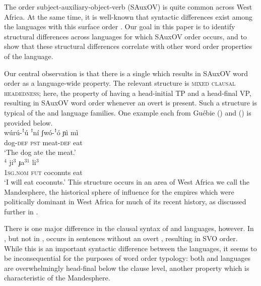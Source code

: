 \documentclass[output=paper,newtxmath,modfonts,nonflat,draftmode]{langsci/langscibook}
\begin{document}
The order subject-auxiliary-object-verb (SAuxOV) is quite common across West Africa. At the same time, it is well-known that syntactic differences exist among the languages with this surface order \citep{Creissels2005typology}. Our goal in this paper is to identify structural differences across languages for which SAuxOV order occurs, and to show that these structural differences correlate with other word order properties of the language.

Our central observation is that there is a single  which results in SAuxOV word order as a language-wide property. The relevant structure is \textsc{mixed clausal headedness}; here, the property of having a head-initial TP and a head-final VP, resulting in SAuxOV word order whenever an overt  is present. Such a structure is typical of the  and  language families. One example each from Guébie () and  () is provided below.
\ea 
\label{ex:1:sauxov}
\ea {} \\ 
\gll wúrú-ꜝú {ꜝ{ní}} {ʃwó-ꜝó} {{ɲì mì}}  \\
{dog}-\textsc{def} \textsc{pst} meat-\textsc{def} eat\\
\glt `The dog ate the meat.'  \label{ex:1b:sauxov}
\ex {} \\ 
$^{4}$ {ji}$^{3}$ {ɟa}$^{31}$ {li}$^{3}$\\
\textsc{1sg}.\textsc{nom} \textsc{fut} coconuts eat \\
\glt `I will eat coconuts.'  \label{ex:1a:sauxov}
\z
\z
This structure occurs in an area of West Africa we call the Mandesphere, the historical sphere of influence for the  empires which were politically dominant in West Africa for much of its recent history, as discussed further in .

There is one major difference in the clausal syntax of  and  languages, however. In , but not in ,  occurs in sentences without an overt , resulting in SVO order. While this is an important syntactic difference between the languages, it seems to be inconsequential for the purposes of word order typology: both  and  languages are overwhelmingly head-final below the clause level, another property which is characteristic of the Mandesphere.
\end{document}
